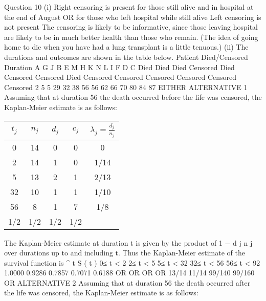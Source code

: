 \documentclass[a4paper,12pt]{article}
\begin{document}
\newpage
Question 10
(i)
Right censoring is present
for those still alive and in hospital at the end of August
OR
for those who left hospital while still alive
Left censoring is not present
The censoring is likely to be informative, since those leaving hospital are
likely to be in much better health than those who remain. (The idea of going home to
die when you have had a lung transplant is a little tenuous.)
(ii)
The durations and outcomes are shown in the table below.
Patient Died/Censored Duration
A
G
J
B
E
M
H
K
N
L
I
F
D
C Died
Died
Died
Censored
Died
Censored
Censored
Died
Censored
Censored
Censored
Censored
Censored
Censored 2
5
5
29
32
38
56
56
62
66
70
80
84
87
EITHER ALTERNATIVE 1
Assuming that at duration 56 the death occurred before the life was censored, the
Kaplan-Meier estimate is as follows:
\begin{center}
\begin{tabular}{|c|c|c|c|c|}
$t_j$	&	$n_j$	&	$d_j$	&	$c_j$	&	$\lambda_{j} = \frac{d_j}{n_j}$	\\ \hline
0	&	14	&	0	&	0	&	0	\\ \hline
2	&	14	&	1	&	0	&	1/14	\\ \hline
5	&	13	&	2	&	1	&	2/13	\\ \hline
32	&	10	&	1	&	1	&	1/10	\\ \hline
56	&	8	&	1	&	7	&	1/8	\\ \hline
1/2	&	1/2	&	1/2	&	1/2	&		\\ \hline
\end{tabular}
\end{center}
The Kaplan-Meier estimate at duration t is given by the product of 1 −
d j
n j
over
durations up to and including t. Thus the Kaplan-Meier estimate of the survival
function is
^
t S ( t )
0≤ t < 2
2≤ t < 5
5≤ t < 32
32≤ t < 56
56≤ t < 92 1.0000
0.9286
0.7857
0.7071
0.6188
OR
OR
OR
OR
13/14
11/14
99/140
99/160
OR ALTERNATIVE 2
Assuming that at duration 56 the death occurred after the life was
censored, the Kaplan-Meier estimate is as follows:
\end{document}
